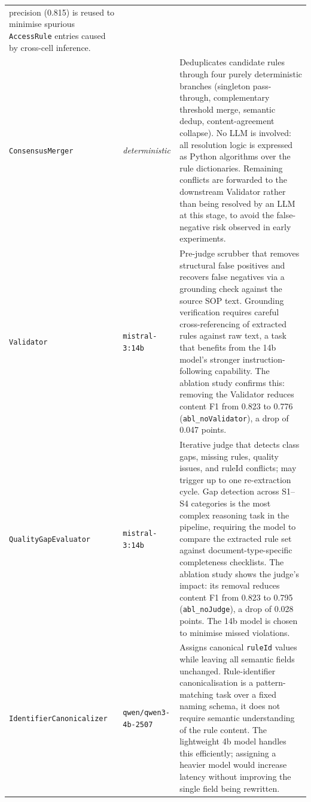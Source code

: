 ﻿\documentclass[11pt]{article}
\begin{document}
\begin{table}[htbp]
{\begin{tabular}{@{}l l p{10cm}@{}}
    precision (0.815) is reused to minimise spurious \texttt{AccessRule} entries
    caused by cross-cell inference. \\
\texttt{ConsensusMerger}
  & \emph{deterministic}
  & Deduplicates candidate rules through four purely deterministic branches
    (singleton pass-through, complementary threshold merge, semantic dedup,
    content-agreement collapse). No LLM is involved: all resolution logic is
    expressed as Python algorithms over the rule dictionaries.  Remaining
    conflicts are forwarded to the downstream Validator rather than being
    resolved by an LLM at this stage, to avoid the false-negative risk observed
    in early experiments. \\
\texttt{Validator}
  & \texttt{mistral-3:14b}
  & Pre-judge scrubber that removes structural false positives and recovers
    false negatives via a grounding check against the source SOP text.
    Grounding verification requires careful cross-referencing of extracted rules
    against raw text, a task that benefits from the 14b model's stronger
    instruction-following capability.  The ablation study confirms this:
    removing the Validator reduces content F1 from 0.823 to 0.776
    (\texttt{abl\_noValidator}), a drop of 0.047 points. \\
\texttt{QualityGapEvaluator}
  & \texttt{mistral-3:14b}
  & Iterative judge that detects class gaps, missing rules, quality issues, and
    ruleId conflicts; may trigger up to one re-extraction cycle.
    Gap detection across S1--S4 categories is the most complex reasoning task in
    the pipeline, requiring the model to compare the extracted rule set against
    document-type-specific completeness checklists.
    The ablation study shows the judge's impact: its removal reduces content F1
    from 0.823 to 0.795 (\texttt{abl\_noJudge}), a drop of 0.028 points.
    The 14b model is chosen to minimise missed violations. \\
\texttt{IdentifierCanonicalizer}
  & \texttt{qwen/qwen3-4b-2507}
  & Assigns canonical \texttt{ruleId} values while leaving all semantic fields
    unchanged.  Rule-identifier canonicalisation is a pattern-matching task over
    a fixed naming schema, it does not require semantic understanding of the
    rule content.  The lightweight 4b model handles this efficiently; assigning
    a heavier model would increase latency without improving the single field
    being rewritten. \\
\bottomrule
\end{tabular}%
}
\end{table}
\end{document}
